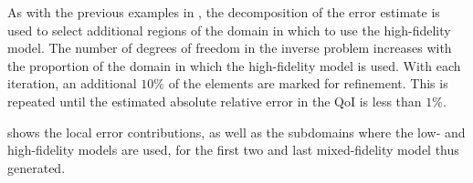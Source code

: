 \documentclass[review,sort&compress]{elsarticle}
\theoremstyle{plain} %
\theoremstyle{definition} %
\begin{document}
As with the previous examples in , the decomposition of the error estimate is used to select additional regions of the domain in which to use the high-fidelity model. The number of degrees of freedom in the inverse problem increases with the proportion of the domain in which the high-fidelity model is used. With each iteration, an additional $10\%$ of the elements are marked for refinement. This is repeated until the estimated absolute relative error in the QoI is less than $1\%$.

 shows the local error contributions, as well as the subdomains where the low- and high-fidelity models are used, for the first two and last mixed-fidelity model thus generated. 
%
\begin{figure}[htbp]
\centering
{} \\
 \\
\end{figure}
\end{document}
